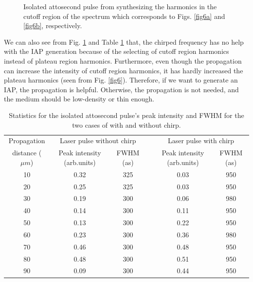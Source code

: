 \documentclass[10pt,letterpaper]{article}
\begin{document}
\begin{figure}[!htbp]
	\centering
	\hspace{-0.2in}
	\caption{Isolated attosecond pulse from synthesizing the harmonics in the cutoff region of the spectrum which corresponds to Figs. \ref{fig6a} and \ref{fig6b}, respectively.}
	\label{fig7}
\end{figure}

We can also see from Fig. \ref{fig7} and Table \ref{table1} that, the chirped frequency has no help with the IAP generation because of the selecting of cutoff region harmonics instead of plateau region harmonics. Furthermore, even though the propagation can increase the intensity of cutoff region harmonics, it has hardly increased the plateau harmonics (seen from Fig. \ref{fig6}). Therefore, if we want to generate an IAP, the propagation is helpful. Otherwise, the propagation is not needed, and the medium should be low-density or thin enough. 

\begin{table}[!htbp]
	\centering
	\caption{Statistics for the isolated attosecond pulse's peak intensity and FWHM for the two cases of with and without chirp.}
\begin{tabular}{cccccc}
	\hline 
	Propagation & \multicolumn{2}{c}{Laser pulse without chirp} &  & \multicolumn{2}{c}{Laser pulse with chirp}\tabularnewline
	\cline{2-3} \cline{5-6} 
	distance ($\mu m$) & Peak intensity (arb.units) & FWHM (as) &  & Peak intensity (arb.units) & FWHM (as)\tabularnewline
	\hline 
	10 & 0.32 & 325 && 0.03 & 950\tabularnewline
	20 & 0.25 & 325 && 0.03 & 950\tabularnewline
	30 & 0.19 & 300 && 0.06 & 980\tabularnewline
	40 & 0.14 & 300 && 0.11 & 950\tabularnewline
	50 & 0.13 & 300 && 0.22 & 950\tabularnewline
	60 & 0.23 & 300 && 0.36 & 980\tabularnewline
	70 & 0.46 & 300 && 0.48 & 950\tabularnewline
	80 & 0.48 & 300 && 0.51 & 950\tabularnewline
	90 & 0.09 & 300 && 0.44 & 950\tabularnewline
	\hline 
\end{tabular}
	\label{table1}

\end{table}
\end{document}
